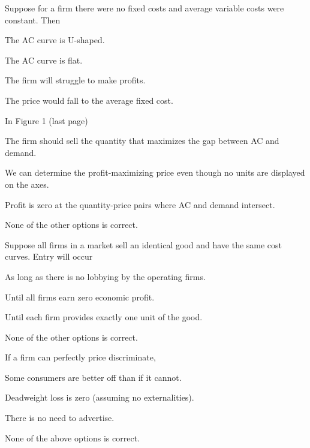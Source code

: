 \documentclass[12pt]{article}
\newcommand{\question}[1]{%
  \Needspace{9\baselineskip}%
  \item #1%
  \vspace{-0.45em}  %
}
\begin{document}
\begin{questions}
  \question{Suppose for a firm there were no fixed costs and average variable costs were constant. Then}
  \begin{choices}
    \item The AC curve is U-shaped.
    \item The AC curve is flat.
    \item The firm will struggle to make profits.
    \item The price would fall to the average fixed cost.
  \end{choices}


  \question{In Figure 1 (last page)}
  \begin{choices}
    \item The firm should sell the quantity that maximizes the gap between AC and demand.
    \item We can determine the profit-maximizing price even though no units are displayed on the axes.
    \item Profit is zero at the quantity-price pairs where AC and demand intersect.
    \item None of the other options is correct.
  \end{choices}


  \question{Suppose all firms in a market sell an identical good and have the same cost curves. Entry will occur}
  \begin{choices}
    \item As long as there is no lobbying by the operating firms.
    \item Until all firms earn zero economic profit.
    \item Until each firm provides exactly one unit of the good.
    \item None of the other options is correct.
  \end{choices}


  \question{If a firm can perfectly price discriminate,}
  \begin{choices}
    \item Some consumers are better off than if it cannot.
    \item Deadweight loss is zero (assuming no externalities).
    \item There is no need to advertise.
    \item None of the above options is correct.
  \end{choices}



\end{questions}
\end{document}
